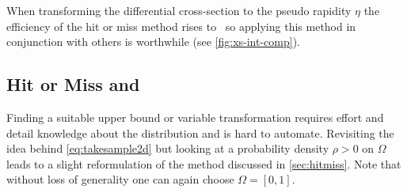 When transforming the differential cross-section to the pseudo
rapidity \(\eta\) the efficiency of the hit or miss method rises
to~ so applying this method in conjunction
with others is worthwhile (see \cref{fig:xs-int-comp}).

\subsection{Hit or Miss and \vegas}%
\label{sec:stratsamp}

Finding a suitable upper bound or variable transformation requires
effort and detail knowledge about the distribution and is hard to
automate. Revisiting the idea behind \cref{eq:takesample2d} but
looking at a probability density \(\rho > 0\) on \(\Omega\) leads to a
slight reformulation of the method discussed in
\cref{sec:hitmiss}. Note that without loss of generality one can again
choose \(\Omega = [0, 1]\).

